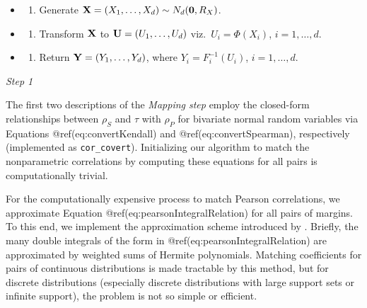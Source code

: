 \documentclass[
]{jss}
\providecommand{\tightlist}{%
  \setlength{\itemsep}{0pt}\setlength{\parskip}{0pt}}
\begin{document}
\begin{enumerate}
  \begin{itemize}
  \item
    \begin{enumerate}
    \def\labelenumii{(\roman{enumii})}
    \tightlist
    \item
      Generate \({\bf X}=(X_1, \ldots, X_d) \sim N_d({\bf 0}, R_X)\).
    \end{enumerate}
  \item
    \begin{enumerate}
    \def\labelenumii{(\roman{enumii})}
    \setcounter{enumii}{1}
    \tightlist
    \item
      Transform \({\bf X}\) to \({\bf U} = (U_1, \ldots, U_d)\)
      viz.~\(U_i=\Phi(X_i)\), \(i=1, \ldots, d\).
    \end{enumerate}
  \item
    \begin{enumerate}
    \def\labelenumii{(\roman{enumii})}
    \setcounter{enumii}{2}
    \tightlist
    \item
      Return \({\bf Y} = (Y_1, \ldots, Y_d)\), where
      \(Y_i=F_i^{-1}(U_i)\), \(i=1, \ldots, d\).
    \end{enumerate}
  \end{itemize}
\end{enumerate}


\emph{Step 1}

The first two descriptions of the \emph{Mapping step} employ the
closed-form relationships between \(\rho_S\) and \(\tau\) with
\(\rho_P\) for bivariate normal random variables via Equations
@ref(eq:convertKendall) and @ref(eq:convertSpearman), respectively
(implemented as \texttt{cor\_covert}). Initializing our algorithm to
match the nonparametric correlations by computing these equations for
all pairs is computationally trivial.

For the computationally expensive process to match Pearson correlations,
we approximate Equation @ref(eq:pearsonIntegralRelation) for all pairs
of margins. To this end, we implement the approximation scheme
introduced by \citet{xiao2019matching}. Briefly, the many double
integrals of the form in @ref(eq:pearsonIntegralRelation) are
approximated by weighted sums of Hermite polynomials. Matching
coefficients for pairs of continuous distributions is made tractable by
this method, but for discrete distributions (especially discrete
distributions with large support sets or infinite support), the problem
is not so simple or efficient.
\end{document}
